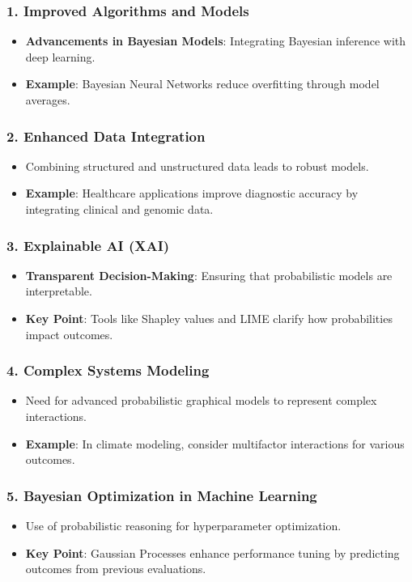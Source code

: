 \documentclass[aspectratio=169]{beamer}
\begin{document}
\begin{frame}[fragile]
    \frametitle{1. Improved Algorithms and Models}
    \begin{itemize}
        \item \textbf{Advancements in Bayesian Models}: Integrating Bayesian inference with deep learning.
        \item \textbf{Example}: Bayesian Neural Networks reduce overfitting through model averages.
    \end{itemize}
\end{frame}

\begin{frame}[fragile]
    \frametitle{2. Enhanced Data Integration}
    \begin{itemize}
        \item Combining structured and unstructured data leads to robust models.
        \item \textbf{Example}: Healthcare applications improve diagnostic accuracy by integrating clinical and genomic data.
    \end{itemize}
\end{frame}

\begin{frame}[fragile]
    \frametitle{3. Explainable AI (XAI)}
    \begin{itemize}
        \item \textbf{Transparent Decision-Making}: Ensuring that probabilistic models are interpretable.
        \item \textbf{Key Point}: Tools like Shapley values and LIME clarify how probabilities impact outcomes.
    \end{itemize}
\end{frame}

\begin{frame}[fragile]
    \frametitle{4. Complex Systems Modeling}
    \begin{itemize}
        \item Need for advanced probabilistic graphical models to represent complex interactions.
        \item \textbf{Example}: In climate modeling, consider multifactor interactions for various outcomes.
    \end{itemize}
\end{frame}

\begin{frame}[fragile]
    \frametitle{5. Bayesian Optimization in Machine Learning}
    \begin{itemize}
        \item Use of probabilistic reasoning for hyperparameter optimization.
        \item \textbf{Key Point}: Gaussian Processes enhance performance tuning by predicting outcomes from previous evaluations.
    \end{itemize}
\end{frame}
\end{document}
